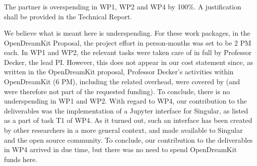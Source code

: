\begin{itemize}
\subsubsection{}

\begin{EUcomment}
  The partner is overspending in WP1, WP2 and WP4 by 100\%. A
  justification shall be provided in the Technical Report.
\end{EUcomment}
We believe what is meant here is underspending. For these work packages, in the OpenDreamKit Proposal, 
the  project effort in person‑months was set to be 2 PM each. In WP1 and WP2, the relevant tasks were taken care 
of in full by Professor Decker, the lead PI. However, this does not appear in our cost statement since, as written
in the OpenDreamKit proposal,  Professor Decker’s activities within OpenDreamKit (6 PM), including the related 
overhead, were covered by  (and were therefore not part of the requested funding). To conclude, there is 
no  underspending in WP1 and WP2. With regard to WP4, our contribution to the deliverables was the 
implementation of a Jupyter interface for Singular, as listed as a part of task T1 of WP4. As it turned out, 
such an interface has been created by other researchers in a more general context, and made available to 
Singular and the open source community. To conclude, our contribution to the deliverables in WP4 arrived
in due time, but there was no need to spend OpenDreamKit funds here.


\end{itemize}
